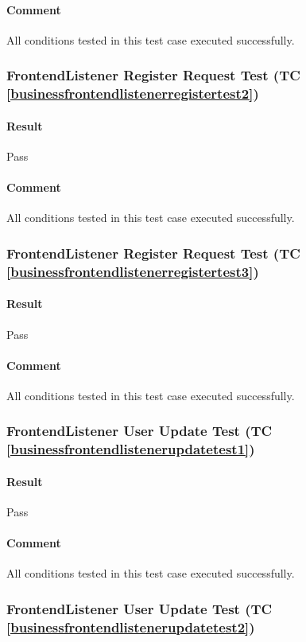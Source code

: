 \documentclass[hidelinks,english]{article}
\begin{document}
				\paragraph{Comment} All conditions tested in this test case executed successfully.
				
			\subsubsection{FrontendListener Register Request Test (TC \ref{businessfrontendlistenerregistertest2})}
				\paragraph{Result} Pass
				\paragraph{Comment} All conditions tested in this test case executed successfully.
				
			\subsubsection{FrontendListener Register Request Test (TC \ref{businessfrontendlistenerregistertest3})}
				\paragraph{Result} Pass
				\paragraph{Comment} All conditions tested in this test case executed successfully.
				
			\subsubsection{FrontendListener User Update Test (TC \ref{businessfrontendlistenerupdatetest1})}
				\paragraph{Result} Pass
				\paragraph{Comment} All conditions tested in this test case executed successfully.
				
			\subsubsection{FrontendListener User Update Test (TC \ref{businessfrontendlistenerupdatetest2})}
\end{document}
